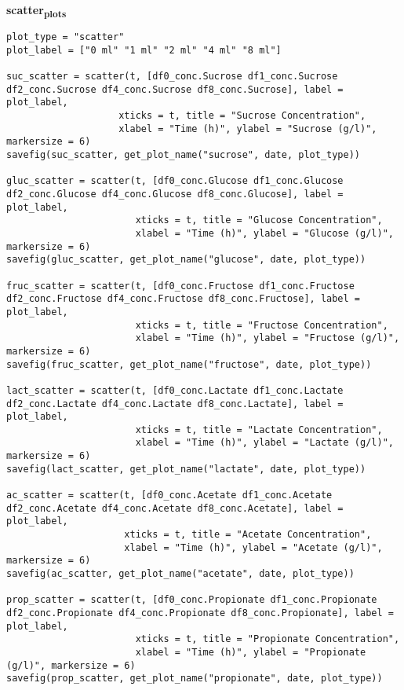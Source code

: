 \documentclass[11pt]{article}
\begin{document}
\textbf{scatter\textsubscript{plots}}
\begin{verbatim}
plot_type = "scatter"
plot_label = ["0 ml" "1 ml" "2 ml" "4 ml" "8 ml"]

suc_scatter = scatter(t, [df0_conc.Sucrose df1_conc.Sucrose df2_conc.Sucrose df4_conc.Sucrose df8_conc.Sucrose], label = plot_label,
                    xticks = t, title = "Sucrose Concentration",
                    xlabel = "Time (h)", ylabel = "Sucrose (g/l)", markersize = 6)
savefig(suc_scatter, get_plot_name("sucrose", date, plot_type))

gluc_scatter = scatter(t, [df0_conc.Glucose df1_conc.Glucose df2_conc.Glucose df4_conc.Glucose df8_conc.Glucose], label = plot_label,
                       xticks = t, title = "Glucose Concentration",
                       xlabel = "Time (h)", ylabel = "Glucose (g/l)", markersize = 6)
savefig(gluc_scatter, get_plot_name("glucose", date, plot_type))

fruc_scatter = scatter(t, [df0_conc.Fructose df1_conc.Fructose df2_conc.Fructose df4_conc.Fructose df8_conc.Fructose], label = plot_label,
                       xticks = t, title = "Fructose Concentration",
                       xlabel = "Time (h)", ylabel = "Fructose (g/l)", markersize = 6)
savefig(fruc_scatter, get_plot_name("fructose", date, plot_type))

lact_scatter = scatter(t, [df0_conc.Lactate df1_conc.Lactate df2_conc.Lactate df4_conc.Lactate df8_conc.Lactate], label = plot_label,
                       xticks = t, title = "Lactate Concentration",
                       xlabel = "Time (h)", ylabel = "Lactate (g/l)", markersize = 6)
savefig(lact_scatter, get_plot_name("lactate", date, plot_type))

ac_scatter = scatter(t, [df0_conc.Acetate df1_conc.Acetate df2_conc.Acetate df4_conc.Acetate df8_conc.Acetate], label = plot_label,
                     xticks = t, title = "Acetate Concentration",
                     xlabel = "Time (h)", ylabel = "Acetate (g/l)", markersize = 6)
savefig(ac_scatter, get_plot_name("acetate", date, plot_type))

prop_scatter = scatter(t, [df0_conc.Propionate df1_conc.Propionate df2_conc.Propionate df4_conc.Propionate df8_conc.Propionate], label = plot_label,
                       xticks = t, title = "Propionate Concentration",
                       xlabel = "Time (h)", ylabel = "Propionate (g/l)", markersize = 6)
savefig(prop_scatter, get_plot_name("propionate", date, plot_type))


\end{verbatim}
\end{document}

